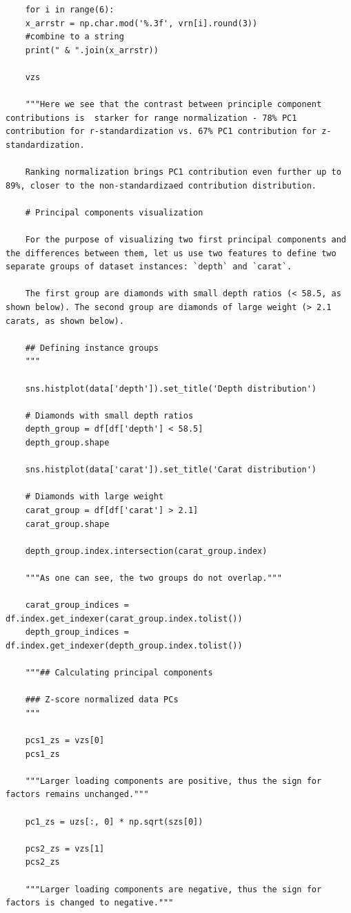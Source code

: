 \documentclass[12pt,a4paper]{article}
\begin{document}
\begin{lstlisting}
	for i in range(6):
	x_arrstr = np.char.mod('%.3f', vrn[i].round(3))
	#combine to a string
	print(" & ".join(x_arrstr))
	
	vzs
	
	"""Here we see that the contrast between principle component contributions is  starker for range normalization - 78% PC1 contribution for r-standardization vs. 67% PC1 contribution for z-standardization.
	
	Ranking normalization brings PC1 contribution even further up to 89%, closer to the non-standardizaed contribution distribution.
	
	# Principal components visualization
	
	For the purpose of visualizing two first principal components and the differences between them, let us use two features to define two separate groups of dataset instances: `depth` and `carat`.
	
	The first group are diamonds with small depth ratios (< 58.5, as shown below). The second group are diamonds of large weight (> 2.1 carats, as shown below).
	
	## Defining instance groups
	"""
	
	sns.histplot(data['depth']).set_title('Depth distribution')
	
	# Diamonds with small depth ratios
	depth_group = df[df['depth'] < 58.5]
	depth_group.shape
	
	sns.histplot(data['carat']).set_title('Carat distribution')
	
	# Diamonds with large weight
	carat_group = df[df['carat'] > 2.1]
	carat_group.shape
	
	depth_group.index.intersection(carat_group.index)
	
	"""As one can see, the two groups do not overlap."""
	
	carat_group_indices = df.index.get_indexer(carat_group.index.tolist())
	depth_group_indices = df.index.get_indexer(depth_group.index.tolist())
	
	"""## Calculating principal components
	
	### Z-score normalized data PCs
	"""
	
	pcs1_zs = vzs[0]
	pcs1_zs
	
	"""Larger loading components are positive, thus the sign for factors remains unchanged."""
	
	pc1_zs = uzs[:, 0] * np.sqrt(szs[0])
	
	pcs2_zs = vzs[1]
	pcs2_zs
	
	"""Larger loading components are negative, thus the sign for factors is changed to negative."""
	

\end{lstlisting}
\end{document}
